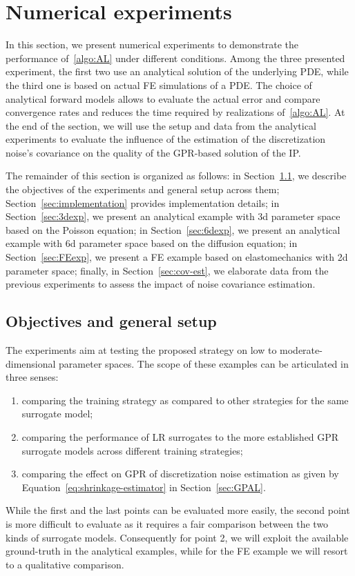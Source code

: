 \section{Numerical experiments}\label{sec:exp}

In this section, we present numerical experiments to demonstrate the performance of~\ref{algo:AL} under different conditions. 
Among the three presented experiment, the first two use an analytical solution of the underlying PDE, while the third one is based on actual FE simulations of a PDE.
The choice of analytical forward models allows to evaluate the actual error and compare convergence rates and reduces the time required by realizations of~\ref{algo:AL}. 
At the end of the section, we will use the setup and data from the analytical experiments to evaluate the influence of the estimation of the discretization noise's covariance on the quality of the GPR-based solution of the IP.  \medskip 

The remainder of this section is organized as follows: in Section~\ref{sec:setup}, we describe the objectives of the experiments and general setup across them; Section~\ref{sec:implementation} provides implementation details; in Section~\ref{sec:3dexp}, we present an analytical example with 3d parameter space based on the Poisson equation; in Section~\ref{sec:6dexp}, we present an analytical example with 6d parameter space based on the diffusion equation; in Section~\ref{sec:FEexp}, we present a FE example based on elastomechanics with 2d parameter space; finally, in Section~\ref{sec:cov-est}, we elaborate data from the previous experiments to assess the impact of noise covariance estimation.

\subsection{Objectives and general setup}\label{sec:setup}

The experiments aim at testing the proposed strategy on low to moderate-dimensional parameter spaces.
The scope of these examples can be articulated in three senses:
\begin{enumerate}
    \item comparing the training strategy as compared to other strategies for the same surrogate model;
    \item comparing the performance of LR surrogates to the more established GPR surrogate models across different training strategies;
    \item comparing the effect on GPR of discretization noise estimation as given by Equation~\eqref{eq:shrinkage-estimator} in Section~\ref{sec:GPAL}.
\end{enumerate}
While the first and the last points can be evaluated more easily, the second point is more difficult to evaluate as it requires a fair comparison between the two kinds of surrogate models.
Consequently for point 2, we will exploit the available ground-truth in the analytical examples, while for the FE example we will resort to a qualitative comparison.

